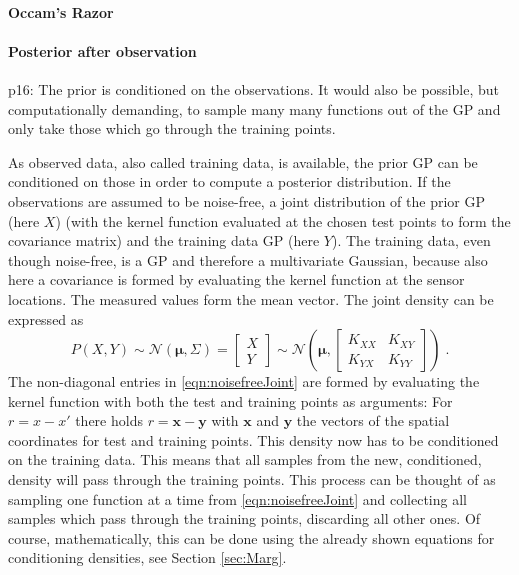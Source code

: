 \documentclass[%
  a4paper,oneside,%
  11pt,%
  smallchapters,
  style=printdev,
  extramargin,
  green,%
  rgb, <cmyk>
  ]{tubsbook}
\begin{document}
	
			
\paragraph{Occam's Razor}

\paragraph{Posterior after observation}
\label{sec:GPcond}
p16:
The prior is conditioned on the observations. It would also be possible, but computationally demanding, to sample many many functions out of the GP and only take those which go through the training points.

As observed data, also called training data, is available, the prior GP can be conditioned on those in order to compute a posterior distribution. If the observations are assumed to be noise-free, a joint distribution of the prior GP (here $X$) (with the kernel function evaluated at the chosen test points to form the covariance matrix) and the training data GP (here $Y$). The training data, even though noise-free, is a GP and therefore a multivariate Gaussian, because also here a covariance is formed by evaluating the kernel function at the sensor locations. The measured values form the mean vector. The joint density can be expressed as
%
\begin{equation}
P(X,Y) \sim \mathcal{N}(\bm{\mu},\Sigma) = \begin{bmatrix}
           X \\
           Y
         \end{bmatrix} \sim \mathcal{N}\left( \bm{\mu}, \begin{bmatrix}
K_{XX} & K_{XY} \\
K_{YX} & K_{YY} 
\end{bmatrix}  \right) \; .
\label{eqn:noisefreeJoint}
\end{equation}
The non-diagonal entries in \ref{eqn:noisefreeJoint} are formed by evaluating the kernel function with both the test and training points as arguments: For $r = x-x'$ there holds $r = \bm{x} - \bm{y}$ with $\bm{x}$ and $\bm{y}$ the vectors of the spatial coordinates for test and training points.
This density now has to be conditioned on the training data. This means that all samples from the new, conditioned, density will pass through the training points. This process can be thought of as sampling one function at a time from \ref{eqn:noisefreeJoint} and collecting all samples which pass through the training points, discarding all other ones. Of course, mathematically, this can be done using the already shown equations for conditioning densities, see Section \ref{sec:Marg}.
\end{document}
